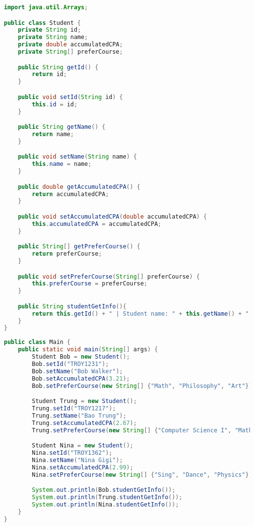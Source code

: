 \documentclass{article}
\begin{document}
\begin{lstlisting}[language=Java, caption=Student.java]
import java.util.Arrays;

public class Student {
    private String id;
    private String name;
    private double accumulatedCPA;
    private String[] preferCourse;

    public String getId() {
        return id;
    }

    public void setId(String id) {
        this.id = id;
    }

    public String getName() {
        return name;
    }

    public void setName(String name) {
        this.name = name;
    }

    public double getAccumulatedCPA() {
        return accumulatedCPA;
    }

    public void setAccumulatedCPA(double accumulatedCPA) {
        this.accumulatedCPA = accumulatedCPA;
    }

    public String[] getPreferCourse() {
        return preferCourse;
    }

    public void setPreferCourse(String[] preferCourse) {
        this.preferCourse = preferCourse;
    }

    public String studentGetInfo(){
        return this.getId() + " | Student name: " + this.getName() + " | Accumulated CPA:  " + this.getAccumulatedCPA() + " | Student prefer course: " + Arrays.toString(this.getPreferCourse());
    }
}
\end{lstlisting}

\begin{lstlisting}[language=Java, caption=Main.java]
public class Main {
    public static void main(String[] args) {
        Student Bob = new Student();
        Bob.setId("TROY1231");
        Bob.setName("Bob Walker");
        Bob.setAccumulatedCPA(3.21);
        Bob.setPreferCourse(new String[] {"Math", "Philosophy", "Art"});

        Student Trung = new Student();
        Trung.setId("TROY1217");
        Trung.setName("Bao Trung");
        Trung.setAccumulatedCPA(2.67);
        Trung.setPreferCourse(new String[] {"Computer Science I", "Math"});

        Student Nina = new Student();
        Nina.setId("TROY1362");
        Nina.setName("Nina Gigi");
        Nina.setAccumulatedCPA(2.99);
        Nina.setPreferCourse(new String[] {"Sing", "Dance", "Physics"});

        System.out.println(Bob.studentGetInfo());
        System.out.println(Trung.studentGetInfo());
        System.out.println(Nina.studentGetInfo());
    }
}
\end{lstlisting}
\end{document}
